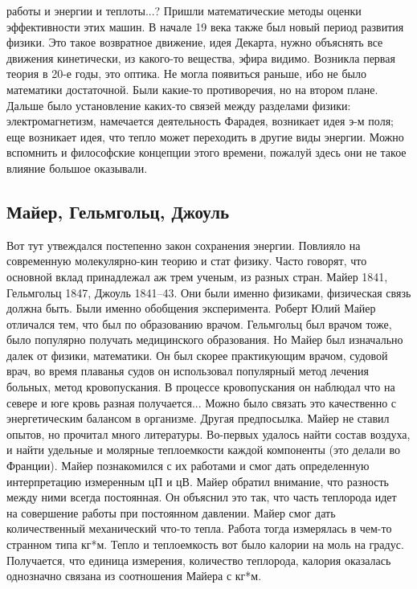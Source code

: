\documentclass[a4paper, 12pt]{article}
\begin{document}
работы и энергии и теплоты...? Пришли математические методы оценки 
эффективности этих машин. В начале 19 века также был новый период 
развития физики. Это такое возвратное движение, идея Декарта, нужно 
объяснять все движения кинетически, из какого-то вещества, эфира видимо. 
Возникла первая теория в 20-е годы, это оптика. Не могла появиться 
раньше, ибо не было математики достаточной. Были какие-то противоречия, 
но на втором плане. Дальше было установление каких-то связей между 
разделами физики: электромагнетизм, намечается деятельность Фарадея, 
возникает идея э-м поля; еще возникает идея, что тепло может переходить 
в другие виды энергии. Можно вспомнить и философские концепции этого 
времени, пожалуй здесь они не такое влияние большое оказывали.

\subsection{Майер, Гельмгольц, Джоуль}

Вот тут утвеждался постепенно закон сохранения энергии. Повлияло на 
современную молекулярно-кин теорию и стат физику. Часто говорят, что 
основной вклад принадлежал аж трем ученым, из разных стран. Майер 1841, 
Гельмгольц 1847, Джоуль 1841--43. Они были именно физиками, физическая 
связь должна быть. Были именно обобщения эксперимента. Роберт Юлий Майер 
отличался тем, что был по образованию врачом. Гельмгольц был врачом 
тоже, было популярно получать медицинского образования. Но Майер был 
изначально далек от физики, математики. Он был скорее практикующим 
врачом, судовой врач, во время плаванья судов он использовал популярный 
метод лечения больных, метод кровопускания. В процессе кровопускания он 
наблюдал что на севере и юге кровь разная получается... Можно было 
связать это качественно с энергетическим балансом в организме. Другая 
предпосылка. Майер не ставил опытов, но прочитал много литературы. 
Во-первых удалось найти состав воздуха, и найти удельные и молярные 
теплоемкости каждой компоненты (это делали во Франции). Майер 
познакомился с их работами и смог дать определенную интерпретацию 
измеренным цП и цВ. Майер обратил внимание, что разность между ними 
всегда постоянная. Он объяснил это так, что часть теплорода идет на 
совершение работы при постоянном давлении. Майер смог дать 
количественный механический что-то тепла. Работа тогда измерялась 
в чем-то странном типа кг*м. Тепло и теплоемкость вот было калории на 
моль на градус. Получается, что единица измерения, количество теплорода, 
калория оказалась однозначно связана из соотношения Майера с кг*м.
\end{document}
